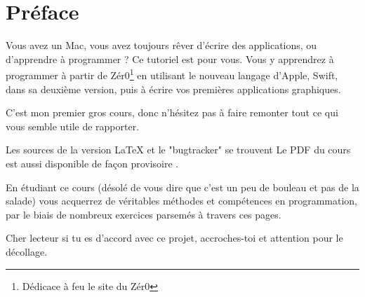 \chapter*{Préface}
{}
Vous avez un Mac, vous avez toujours rêver d'écrire des applications, ou d'apprendre à programmer ?
Ce tutoriel est pour vous.
Vous y apprendrez à programmer à partir de  Zér0\footnote{Dédicace à feu le site du Zér0} 
en utilisant le nouveau langage d'Apple, Swift, dans sa deuxième version, puis à écrire vos premières applications graphiques.

C'est mon premier gros cours, donc n'hésitez pas à faire remonter tout ce qui vous semble utile de rapporter.

Les sources de la version LaTeX et le "bugtracker" se trouvent 
Le PDF du cours est aussi disponible de façon provisoire .

En étudiant ce cours
(désolé de vous dire que c'est un peu de bouleau et pas de la salade)
vous acquerrez de véritables méthodes et compétences en programmation,
par le biais de nombreux exercices parsemés à travers ces pages.

Cher lecteur si tu es d'accord avec ce projet, accroches-toi et attention pour le décollage.
